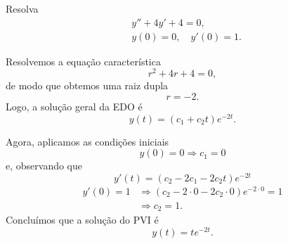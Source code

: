 \begin{exeresol}
  Resolva
  \begin{align}
    &y'' + 4y' + 4 = 0,\\
    &y(0) = 0,\quad y'(0)=1.    
  \end{align}
\end{exeresol}
\begin{resol}
  Resolvemos a equação característica
  \begin{equation}
    r^2 + 4r + 4 = 0,
  \end{equation}
  de modo que obtemos uma raiz dupla
  \begin{equation}
    r = -2.
  \end{equation}
  Logo, a solução geral da EDO é
  \begin{equation}
    y(t) = (c_1 + c_2t)e^{-2t}.
  \end{equation}

  Agora, aplicamos as condições iniciais
  \begin{equation}
    y(0) = 0 \Rightarrow c_1 = 0
  \end{equation}
  e, observando que
  \begin{equation}
    y'(t) = (c_2-2c_1-2c_2t)e^{-2t}
  \end{equation}
  \begin{align}
    y'(0) = 1 &\Rightarrow (c_2-2\cdot 0-2c_2\cdot 0)e^{-2\cdot 0} = 1 \\
              &\Rightarrow c_2 = 1.
  \end{align}
  Concluímos que a solução do PVI é
  \begin{equation}
    y(t) = te^{-2t}.
  \end{equation}
\end{resol}

